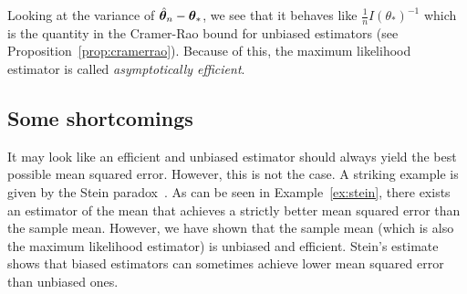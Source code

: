 Looking at the variance of $\hat{\boldsymbol{\theta}}_n - \boldsymbol{\theta}_*$, we see that it behaves like $\frac1{n}I(\theta_*)^{-1}$ which is
the quantity in the Cramer-Rao bound for unbiased estimators (see Proposition~\ref{prop:cramerrao}).
Because of this, the maximum likelihood estimator is called \emph{asymptotically
  efficient}.

\subsection{Some shortcomings}
It may look like an efficient and unbiased estimator should always yield the
best possible mean squared error.
However, this is not the case. A striking example is given by the Stein paradox~\cite{stein1956inadmissibility}.
As can be seen in Example~\ref{ex:stein}, there exists an estimator of the mean
that achieves a strictly better mean squared error than the sample mean.
However, we have shown that the sample mean (which is also the maximum
likelihood estimator) is unbiased and efficient. Stein's estimate shows that
biased estimators can sometimes achieve lower mean squared error than unbiased ones.
